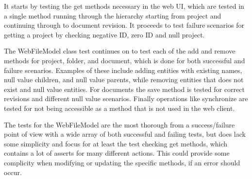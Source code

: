 It starts by testing the get methods necessary in the web UI, which are tested in a single method running through the hierarchy starting from project and continuing through to document revision. It proceeds to test failure scenarios for getting a project by checking negative ID, zero ID and null project.

The WebFileModel class test continues on to test each of the add and remove methods for project, folder, and document, which is done for both successful and failure scenarios. Examples of these include adding entities with existing names, null value children, and null value parents, while removing entities that does not exist and null value entities. For documents the save method is tested for correct revisions and different null value scenarios. Finally operations like synchronize are tested for not being accessible as a method that is not used in the web client.

The tests for the WebFileModel are the most thorough from a success/failure point of view with a wide array of both successful and failing tests, but does lack some simplicity and focus for at least the test checking get methods, which contains a lot of asserts for many different actions. This could provide some complicity when modifying or updating the specific methods, if an error should occur.
